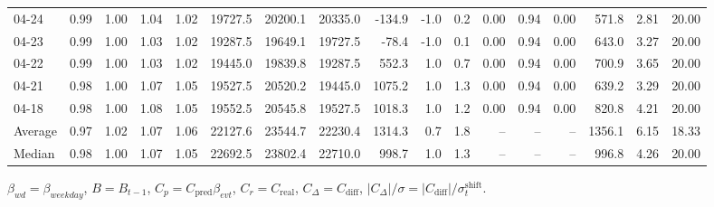 \begin{threeparttable}
{\begin{tabular}{lrrrrrrrrrrrrrrrr}
  04-24 &         0.99 &           1.00 &          1.04 &          1.02 & 19727.5 & 20200.1 & 20335.0 &     -134.9 &                     -1.0 &                 0.2 &       0.00 &      0.94 &           0.00 &            571.8 &            2.81 &                  20.00 \\
  04-23 &         0.99 &           1.00 &          1.03 &          1.02 & 19287.5 & 19649.1 & 19727.5 &      -78.4 &                     -1.0 &                 0.1 &       0.00 &      0.94 &           0.00 &            643.0 &            3.27 &                  20.00 \\
  04-22 &         0.99 &           1.00 &          1.03 &          1.02 & 19445.0 & 19839.8 & 19287.5 &      552.3 &                      1.0 &                 0.7 &       0.00 &      0.94 &           0.00 &            700.9 &            3.65 &                  20.00 \\
  04-21 &         0.98 &           1.00 &          1.07 &          1.05 & 19527.5 & 20520.2 & 19445.0 &     1075.2 &                      1.0 &                 1.3 &       0.00 &      0.94 &           0.00 &            639.2 &            3.29 &                  20.00 \\
  04-18 &         0.98 &           1.00 &          1.08 &          1.05 & 19552.5 & 20545.8 & 19527.5 &     1018.3 &                      1.0 &                 1.2 &       0.00 &      0.94 &           0.00 &            820.8 &            4.21 &                  20.00 \\
Average &         0.97 &           1.02 &          1.07 &          1.06 & 22127.6 & 23544.7 & 22230.4 &     1314.3 &                      0.7 &                 1.8 &         -- &        -- &             -- &           1356.1 &            6.15 &                  18.33 \\
 Median &         0.98 &           1.00 &          1.07 &          1.05 & 22692.5 & 23802.4 & 22710.0 &      998.7 &                      1.0 &                 1.3 &         -- &        -- &             -- &            996.8 &            4.26 &                  20.00 \\
\bottomrule
\end{tabular}
}
\begin{tablenotes}\footnotesize
\item $\beta_{wd}=\beta_{weekday}$, $B=B_{t-1}$,
$C_p=C_{\text{pred}}\beta_{evt}$, $C_r=C_{\text{real}}$,
$C_\Delta=C_{\text{diff}}$, $|C_\Delta|/\sigma=|C_{\text{diff}}|/\sigma_t^{\text{shift}}$.
\end{tablenotes}
\end{threeparttable}
\endgroup
